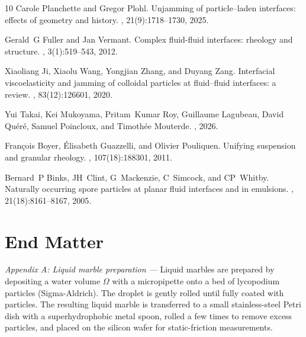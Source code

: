 \documentclass[twocolumn, prl,
 amsmath,amssymb,
 superscriptaddress,aps,
]{revtex4-2}
\begin{document}
\begin{thebibliography}{10}
	Carole Planchette and Gregor Plohl.
	\newblock Unjamming of particle--laden interfaces: effects of geometry and
	history.
	, 21(9):1718--1730, 2025.

	Gerald~G Fuller and Jan Vermant.
	\newblock Complex fluid-fluid interfaces: rheology and structure.
	,
	3(1):519--543, 2012.

	Xiaoliang Ji, Xiaolu Wang, Yongjian Zhang, and Duyang Zang.
	\newblock Interfacial viscoelasticity and jamming of colloidal particles at
	fluid--fluid interfaces: a review.
	, 83(12):126601, 2020.

	Yui Takai, Kei Mukoyama, Pritam~Kumar Roy, Guillaume Lagubeau, David
	Qu{\'e}r{\'e}, Samuel Poincloux, and Timoth{\'e}e Mouterde.
	, 2026.

	Fran{\c{c}}ois Boyer, {\'E}lisabeth Guazzelli, and Olivier Pouliquen.
	\newblock Unifying suspension and granular rheology.
	, 107(18):188301, 2011.

	Bernard~P Binks, JH~Clint, G~Mackenzie, C~Simcock, and CP~Whitby.
	\newblock Naturally occurring spore particles at planar fluid interfaces and in
	emulsions.
	, 21(18):8161--8167, 2005.

\end{thebibliography}

\appendix

\setcounter{figure}{0}
\renewcommand{\thefigure}{S\arabic{figure}}

\section{End Matter}

\textit{Appendix A: Liquid marble preparation ---} Liquid marbles are prepared by depositing a water volume $\Omega$ with a micropipette onto a bed of lycopodium particles (Sigma-Aldrich). The droplet is gently rolled until fully coated with particles. The resulting liquid marble is transferred to a small stainless-steel Petri dish with a superhydrophobic metal spoon, rolled a few times to remove excess particles, and placed on the silicon wafer for static-friction measurements.
\\
\end{document}
